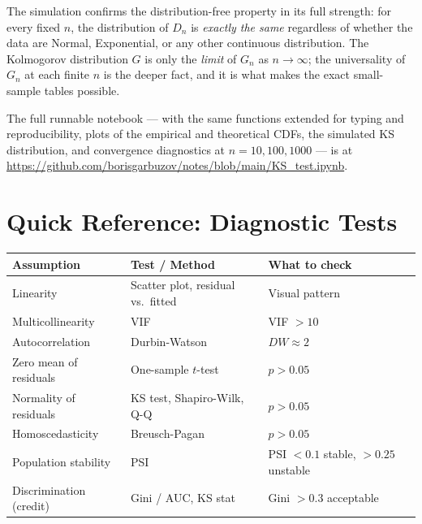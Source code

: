 \documentclass[11pt, a4paper]{article}
\begin{document}
The simulation confirms the distribution-free property in its full strength: for every
fixed $n$, the distribution of $D_n$ is \emph{exactly the same} regardless of whether
the data are Normal, Exponential, or any other continuous distribution.
The Kolmogorov distribution $G$ is only the \emph{limit} of $G_n$ as $n\to\infty$;
the universality of $G_n$ at each finite $n$ is the deeper fact, and it is what makes
the exact small-sample tables possible.

\medskip
The full runnable notebook --- with the same functions extended for typing and
reproducibility, plots of the empirical and theoretical CDFs, the simulated
KS distribution, and convergence diagnostics at $n=10, 100, 1000$ --- is at
\url{https://github.com/borisgarbuzov/notes/blob/main/KS_test.ipynb}.

\section{Quick Reference: Diagnostic Tests}

\begin{center}
\begin{tabular}{lll}
\toprule
\textbf{Assumption} & \textbf{Test / Method} & \textbf{What to check} \\
\midrule
Linearity & Scatter plot, residual vs.\ fitted & Visual pattern \\
Multicollinearity & VIF & VIF $> 10$ \\
Autocorrelation & Durbin-Watson & $DW \approx 2$ \\
Zero mean of residuals & One-sample $t$-test & $p > 0.05$ \\
Normality of residuals & KS test, Shapiro-Wilk, Q-Q & $p > 0.05$ \\
Homoscedasticity & Breusch-Pagan & $p > 0.05$ \\
Population stability & PSI & PSI $< 0.1$ stable, $> 0.25$ unstable \\
Discrimination (credit) & Gini / AUC, KS stat & Gini $> 0.3$ acceptable \\
\bottomrule
\end{tabular}
\end{center}
\end{document}
